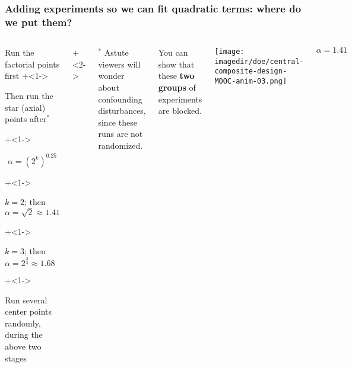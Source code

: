 \begin{frame}\frametitle{Adding experiments so we can fit quadratic terms: where do we put them?}
	\begin{columns}[T]
		
			\vspace{1cm}
			
			\begin{itemize}
				\item	Run the factorial points first
				\onslide+<1->{
					\item	Then run the star (axial) points after$^\ast$
				}
				\onslide+<1->{
					\Large
					\[\alpha  = \left(2^k\right)^{0.25}\]
					
			
					\begin{itemize}
						\onslide+<1->{\item	$k = 2$; then $\alpha = \sqrt{2} \approx 1.41$ }
						\onslide+<1->{\item	$k = 3$; then $\alpha = 2^{\tfrac{3}{4}} \approx 1.68$}
					\end{itemize}
					\normalsize
				}
				\onslide+<1->{
					\item	Run several center points randomly, during the above two stages
				}
			\end{itemize}
			
			\onslide+<2->{
				\vspace{0cm}
				\tiny
				$^\ast$ Astute viewers will wonder about confounding disturbances, since these runs are not randomized.
			
				You can show that these {\color[rgb]{0,0.5,1}\textbf{two}} {\color[rgb]{0.5,0, 0.5}\textbf{groups}} of experiments are blocked.
			}
			
			
			\centerline{\texttt{[image: \\imagedir/doe/central-composite-design-MOOC-anim-03.png]}}
			
			\vspace{-0.5cm}
			\[\alpha = 1.41\]
	\end{columns}
\end{frame}


